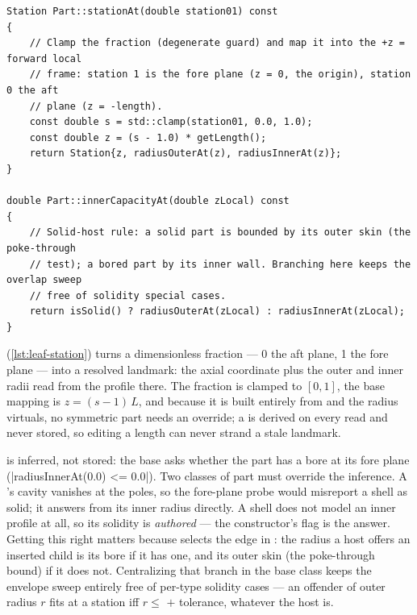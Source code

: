 \begin{listing}[htbp]
\begin{verbatim}
Station Part::stationAt(double station01) const
{
    // Clamp the fraction (degenerate guard) and map it into the +z = forward local
    // frame: station 1 is the fore plane (z = 0, the origin), station 0 the aft
    // plane (z = -length).
    const double s = std::clamp(station01, 0.0, 1.0);
    const double z = (s - 1.0) * getLength();
    return Station{z, radiusOuterAt(z), radiusInnerAt(z)};
}

double Part::innerCapacityAt(double zLocal) const
{
    // Solid-host rule: a solid part is bounded by its outer skin (the poke-through
    // test); a bored part by its inner wall. Branching here keeps the overlap sweep
    // free of solidity special cases.
    return isSolid() ? radiusOuterAt(zLocal) : radiusInnerAt(zLocal);
}
\end{verbatim}
\caption{Fraction-to-landmark mapping and the solid-host rule
(--58).}\label{lst:leaf-station}
\end{listing}

 (\cref{lst:leaf-station}) turns a dimensionless fraction --- 0 the aft
plane, 1 the fore plane --- into a resolved  landmark: the axial coordinate plus the
outer and inner radii read from the profile there. The fraction is clamped to $[0,1]$, the base
mapping is $z = (s-1)\,L$, and because it is built entirely from  and the radius
virtuals, no symmetric part needs an override; a  is derived on every read and never
stored, so editing a length can never strand a stale landmark.

 is inferred, not stored: the base asks whether the part has a bore at its fore
plane (\cppinline|radiusInnerAt(0.0) <= 0.0|). Two classes of part must override the inference.
A 's cavity vanishes at the poles, so the fore-plane probe would misreport a
shell as solid; it answers from its inner radius directly. A shell  does not
model an inner profile at all, so its solidity is \emph{authored} --- the constructor's
 flag is the answer. Getting this right matters because  selects the
edge in : the radius a host offers an inserted child is its bore if it has
one, and its outer skin (the poke-through bound) if it does not. Centralizing that branch in the
base class keeps the envelope sweep entirely free of per-type solidity cases --- an offender of
outer radius $r$ fits at a station iff $r \le$  $+$ tolerance, whatever the
host is.

